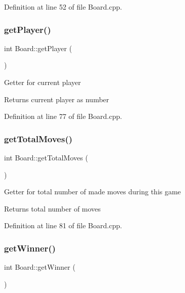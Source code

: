 Definition at line 52 of file Board.\+cpp.

\mbox{\label{classBoard_ad4322f41e87c8a8a99e3424fb2a2a1ec}} 
\subsubsection{\texorpdfstring{get\+Player()}{getPlayer()}}
{\footnotesize\ttfamily int Board\+::get\+Player (\begin{DoxyParamCaption}{ }\end{DoxyParamCaption})}

Getter for current player \begin{DoxyReturn}{Returns}
current player as number 
\end{DoxyReturn}


Definition at line 77 of file Board.\+cpp.

\mbox{\label{classBoard_aedc0672dfb6bddabc1c1cf091b483cbb}} 
\subsubsection{\texorpdfstring{get\+Total\+Moves()}{getTotalMoves()}}
{\footnotesize\ttfamily int Board\+::get\+Total\+Moves (\begin{DoxyParamCaption}{ }\end{DoxyParamCaption})}

Getter for total number of made moves during this game \begin{DoxyReturn}{Returns}
total number of moves 
\end{DoxyReturn}


Definition at line 81 of file Board.\+cpp.

\mbox{\label{classBoard_adef3bc4bb22a2f54b7703ceff15aea5b}} 
\subsubsection{\texorpdfstring{get\+Winner()}{getWinner()}}
{\footnotesize\ttfamily int Board\+::get\+Winner (\begin{DoxyParamCaption}{ }\end{DoxyParamCaption})}

